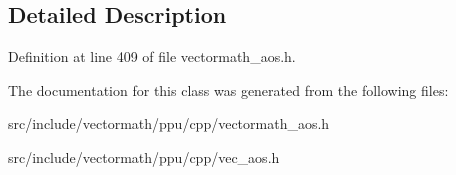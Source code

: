 \subsection{Detailed Description}


Definition at line 409 of file vectormath\-\_\-aos.\-h.



The documentation for this class was generated from the following files\-:\begin{DoxyCompactItemize}
\item 
src/include/vectormath/ppu/cpp/vectormath\-\_\-aos.\-h\item 
src/include/vectormath/ppu/cpp/vec\-\_\-aos.\-h\end{DoxyCompactItemize}
